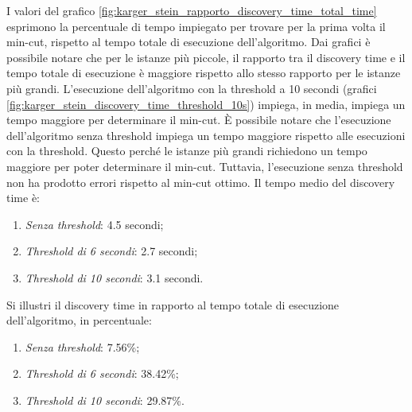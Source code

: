 I valori del grafico \ref{fig:karger_stein_rapporto_discovery_time_total_time} 
esprimono la percentuale di tempo impiegato per trovare per la prima 
volta il min-cut, rispetto al tempo totale di esecuzione dell'algoritmo.
Dai grafici è possibile notare che per le istanze più piccole, il rapporto 
tra il discovery time e il tempo totale di esecuzione è maggiore rispetto 
allo stesso rapporto per le istanze più grandi.
L'esecuzione dell'algoritmo con la threshold a 10 secondi (grafici 
\ref{fig:karger_stein_discovery_time_threshold_10s}) impiega, in media, 
impiega un tempo maggiore per determinare il min-cut. È possibile notare che 
l'esecuzione dell'algoritmo senza threshold impiega un tempo maggiore rispetto 
alle esecuzioni con la threshold. Questo perché le istanze più grandi richiedono 
un tempo maggiore per poter determinare il min-cut. Tuttavia, l'esecuzione senza 
threshold non ha prodotto errori rispetto al min-cut ottimo. Il tempo medio del 
discovery time è:
\begin{enumerate}
	\item \textit{Senza threshold}: 4.5 secondi;
	\item \textit{Threshold di 6 secondi}: 2.7 secondi;
	\item \textit{Threshold di 10 secondi}: 3.1 secondi.
\end{enumerate}

Si illustri il discovery time in rapporto al tempo totale di esecuzione dell'algoritmo, in percentuale:
\begin{enumerate}
	\item \textit{Senza threshold}: 7.56\%;
	\item \textit{Threshold di 6 secondi}: 38.42\%;
	\item \textit{Threshold di 10 secondi}: 29.87\%.
\end{enumerate}

